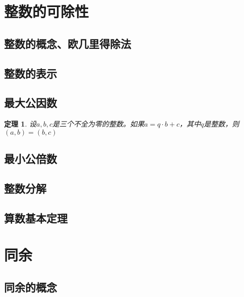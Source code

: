 \documentclass[a4paper]{article}
\newtheorem{theorem}{定理}[subsection]
\begin{document}
\section{整数的可除性}
\subsection{整数的概念、欧几里得除法}
\subsection{整数的表示}
\subsection{最大公因数}
\begin{theorem}
    设$a,b,c$是三个不全为零的整数。如果$a=q\cdot b+c$，其中$q$是整数，则$(a,b)=(b,c)$
\end{theorem}
\subsection{最小公倍数}
\subsection{整数分解}
\subsection{算数基本定理}
\section{同余}
\subsection{同余的概念}
\end{document}

